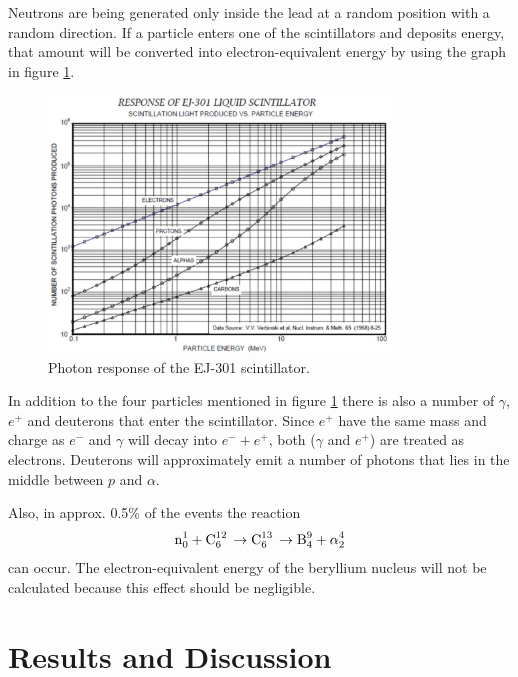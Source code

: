 \documentclass[12pt]{article}
\begin{document}
Neutrons are being generated only inside the lead at a random position with a random direction.
If a particle enters one of the scintillators and deposits energy, that amount will be converted into electron-equivalent energy by using the graph in figure \ref{fig:photonResponse}.
\begin{figure}[htbp]
	\centering
	\includegraphics[width=0.81\textwidth]{./pics/scintillatorResponse.pdf}
	\caption{Photon response of the EJ-301 scintillator.}
	\label{fig:photonResponse}
\end{figure}
In addition to the four particles mentioned in figure \ref{fig:photonResponse} there is also a number of $\gamma$, $e^+$ and deuterons that enter the scintillator. Since $e^+$ have the same mass and charge as $e^-$ and $\gamma$ will decay into $e^- + e^+$, both ($\gamma$ and $e^+$) are treated as electrons. Deuterons will approximately emit a number of photons that lies in the middle between $p$ and $\alpha$. 

Also, in approx. 0.5\% of the events the reaction 
\begin{align}
	\ce{n^1_0 + C^{12}_6 \rightarrow C^{13}_6 \rightarrow B^9_4 + \alpha^4_2 } 
\end{align}
can occur. The electron-equivalent energy of the beryllium nucleus will not be calculated because this effect should be negligible.

\section{Results and Discussion}
%
%
%
\end{document}
